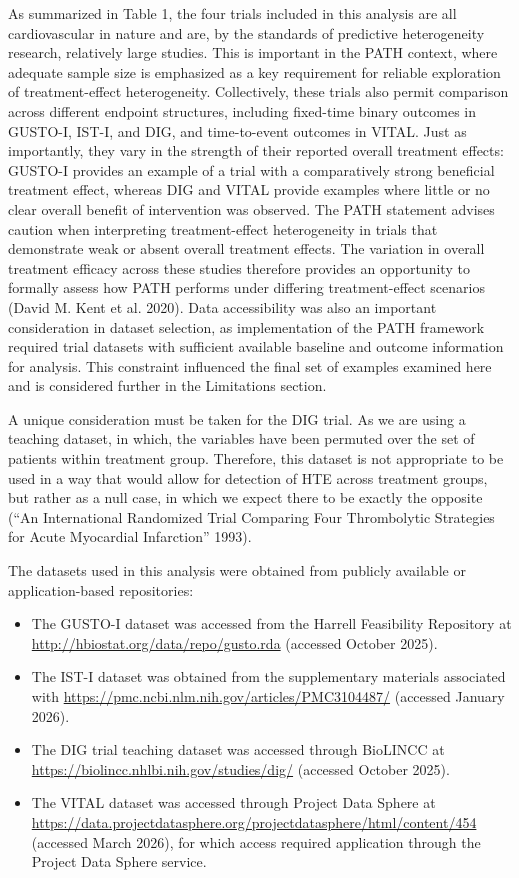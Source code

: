 \documentclass{article}
\providecommand{\tightlist}{%
  \setlength{\itemsep}{0pt}\setlength{\parskip}{0pt}}
\begin{document}
As summarized in Table 1, the four trials included in this analysis are
all cardiovascular in nature and are, by the standards of predictive
heterogeneity research, relatively large studies. This is important in
the PATH context, where adequate sample size is emphasized as a key
requirement for reliable exploration of treatment-effect heterogeneity.
Collectively, these trials also permit comparison across different
endpoint structures, including fixed-time binary outcomes in GUSTO-I,
IST-I, and DIG, and time-to-event outcomes in VITAL. Just as
importantly, they vary in the strength of their reported overall
treatment effects: GUSTO-I provides an example of a trial with a
comparatively strong beneficial treatment effect, whereas DIG and VITAL
provide examples where little or no clear overall benefit of
intervention was observed. The PATH statement advises caution when
interpreting treatment-effect heterogeneity in trials that demonstrate
weak or absent overall treatment effects. The variation in overall
treatment efficacy across these studies therefore provides an
opportunity to formally assess how PATH performs under differing
treatment-effect scenarios (David M. Kent et al. 2020). Data
accessibility was also an important consideration in dataset selection,
as implementation of the PATH framework required trial datasets with
sufficient available baseline and outcome information for analysis. This
constraint influenced the final set of examples examined here and is
considered further in the Limitations section.

A unique consideration must be taken for the DIG trial. As we are using
a teaching dataset, in which, the variables have been permuted over the
set of patients within treatment group. Therefore, this dataset is not
appropriate to be used in a way that would allow for detection of HTE
across treatment groups, but rather as a null case, in which we expect
there to be exactly the opposite ({``An {International Randomized Trial
Comparing Four Thrombolytic Strategies} for {Acute Myocardial
Infarction}''} 1993).

The datasets used in this analysis were obtained from publicly available
or application-based repositories:

\begin{itemize}
\tightlist
\item
  The GUSTO-I dataset was accessed from the Harrell Feasibility
  Repository at \url{http://hbiostat.org/data/repo/gusto.rda} (accessed
  October 2025).
\item
  The IST-I dataset was obtained from the supplementary materials
  associated with
  \url{https://pmc.ncbi.nlm.nih.gov/articles/PMC3104487/} (accessed
  January 2026).
\item
  The DIG trial teaching dataset was accessed through BioLINCC at
  \url{https://biolincc.nhlbi.nih.gov/studies/dig/} (accessed October
  2025).
\item
  The VITAL dataset was accessed through Project Data Sphere at
  \url{https://data.projectdatasphere.org/projectdatasphere/html/content/454}
  (accessed March 2026), for which access required application through
  the Project Data Sphere service.
\end{itemize}
\end{document}
